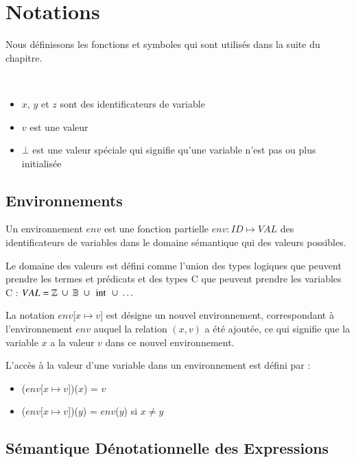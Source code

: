 \section{Notations}
\label{sec:notations}


Nous définissons les fonctions et symboles qui sont utilisés dans la suite du
chapitre.

\begin{notation}
  ~
  \begin{itemize}
  \item $x$, $y$ et $z$ sont des identificateurs de variable
  \item $v$ est une valeur
  \item $\bot$ est une valeur spéciale qui signifie qu'une variable n'est pas
    ou plus initialisée
  \end{itemize}
\end{notation}


\subsection{Environnements}

Un environnement $env$ est une fonction partielle $env : ID \mapsto VAL$ des
identificateurs de variables dans le domaine sémantique qui des valeurs
possibles.

Le domaine des valeurs est défini comme l'union des types logiques que peuvent
prendre les termes et prédicats \eacsl et des types C que peuvent prendre les
variables C :
$VAL = \mathbb{Z}~\cup~\mathbb{B}~\cup~\mbox{\lstinline'int'}~\cup~\ldots$

La notation $env$[$x \mapsto v$] est désigne un nouvel environnement,
correspondant à l'environnement $env$ auquel la relation $(x, v)$ a été ajoutée,
ce qui signifie que la variable $x$ a la valeur $v$ dans ce nouvel
environnement.

L'accès à la valeur d'une variable dans un environnement est défini par :
\begin{itemize}
\item ($env$[$x \mapsto v$])($x$) = $v$
\item ($env$[$x \mapsto v$])($y$) = $env$($y$) si $x \neq y$
\end{itemize}


\subsection{Sémantique Dénotationnelle des Expressions}

